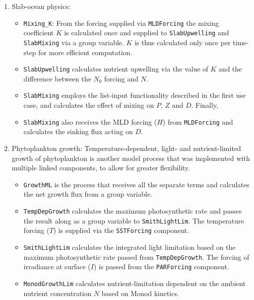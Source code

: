\documentclass[journal abbreviation, manuscript]{copernicus}
\begin{document}
\begin{enumerate}
    \item Slab-ocean physics:
    \begin{itemize}
        \item \texttt{Mixing\_K}: From the forcing supplied via \texttt{MLDForcing} the mixing coefficient $K$ is calculated once and supplied to \texttt{SlabUpwelling} and \texttt{SlabMixing} via a group variable. $K$ is thus calculated only once per time-step for more efficient computation.
        \item \texttt{SlabUpwelling} calculates nutrient upwelling via the value of $K$ and the difference between the $N_0$ forcing and $N$. 
        \item \texttt{SlabMixing} employs the list-input functionality described in the first use case, and calculates the effect of mixing on $P$, $Z$ and $D$. Finally, 
        \item \texttt{SlabMixing} also receives the MLD forcing ($H$) from \texttt{MLDForcing} and calculates the sinking flux acting on $D$.
    \end{itemize}
    
    \item Phytoplankton growth: Temperature-dependent, light- and nutrient-limited growth of phytoplankton is another model process that was implemented with multiple linked components, to allow for greater flexibility.
    \begin{itemize}    
        \item \texttt{GrowthML} is the process that receives all the separate terms and calculates the net growth flux from a group variable. 
        \item \texttt{TempDepGrowth} calculates the maximum photosynthetic rate and passes the result along as a group variable to \texttt{SmithLightLim}. The temperature forcing ($T$) is supplied via the \texttt{SSTForcing} component.
        \item \texttt{SmithLightLim} calculates the integrated light limitation based on the maximum photosynthetic rate passed from \texttt{TempDepGrowth}. The forcing of irradiance at surface ($I$) is passed from the \texttt{PARForcing} component.
        \item \texttt{MonodGrowthLim} calculates nutrient-limitation dependent on the ambient nutrient concentration $N$ based on Monod kinetics. 
    \end{itemize}
    

\end{enumerate}
\end{document}
